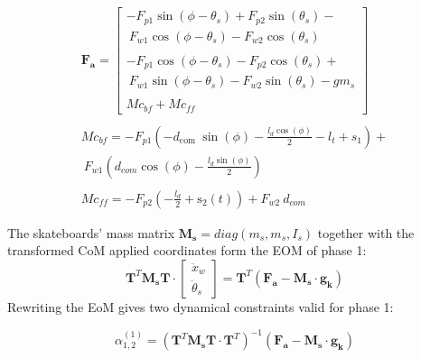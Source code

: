 \documentclass[default,iicol]{sn-jnl}
\theoremstyle{thmstyleone}%
\theoremstyle{thmstyletwo}%
\theoremstyle{thmstylethree}%
\begin{document}
\begin{equation}\label{e_Fi}
\begin{array}{c}
    \mathbf{F_{a}}= \left[\begin{array}{l}
-F_{p 1} \sin \left(\phi-\theta_s\right)+F_{p 2} \sin \left(\theta_s\right)- \\ \ F_{w 1} \cos \left(\phi-\theta_s\right)-F_{w 2} \cos \left(\theta_s\right) \\ \\
-F_{p 1} \cos \left(\phi-\theta_s\right)-F_{p 2} \cos \left(\theta_s\right)+ \\ \ F_{w 1} \sin \left(\phi-\theta_s\right)-F_{w 2} \sin \left(\theta_s\right)-g m_s \\ \\
Mc_{bf} + Mc_{ff}
\end{array}\right] 
\\ \\
Mc_{bf} = -F_{p 1} (-d_{\text {com }} \sin (\phi)-\frac{l_d \cos (\phi)}{2}-l_t+s_1)+ \\ \ F_{w 1}(d_{c o m} \cos (\phi)-\frac{l_d \sin (\phi)}{2})
\\ \\
Mc_{ff} = -F_{p 2}\left(-\frac{l_d}{2}+\mathrm{s}_2(t)\right)+F_{w 2} \ d_{c o m}
\end{array}
\end{equation}  

The skateboards' mass matrix $\mathbf{M_s} = diag(m_s,m_s,I_s)$ together with the transformed CoM applied coordinates form the EOM of phase 1:
\begin{equation} \label{e_eoma}
    \mathbf{T}^T \mathbf{M_s} \mathbf{T} \cdot \left[\begin{array}{c}
         \ddot x_w  \\
         \ddot \theta_s 
    \end{array}\right] = \mathbf{T}^T (\mathbf{F_a} - \mathbf{M_s} \cdot \mathbf{g_k})
\end{equation}
Rewriting the EoM gives two dynamical constraints valid for phase 1:

\begin{equation}
    \alpha_{1,2}^{(1)} =   \left(\mathbf{T}^T \mathbf{M_s} \mathbf{T} \cdot  \mathbf{T}^T\right)^{-1} (\mathbf{F_a} - \mathbf{M_s} \cdot \mathbf{g_k})
\end{equation}
\end{document}
